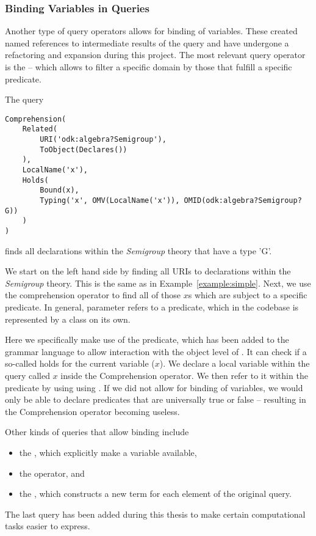 \subsubsection*{Binding Variables in Queries}\label{sec:qmt:binding}

Another type of query operators allows for binding of variables. 
These created named references to intermediate results of the query and have undergone a refactoring and expansion during this project. 
The most relevant query operator is the  -- which allows to filter a specific domain by those that fulfill a specific predicate.


\begin{example}\label{example:filter}
	The query \begin{lstlisting}[language=qmt]
Comprehension(
	Related(
		URI('odk:algebra?Semigroup'), 
		ToObject(Declares())
	), 
	LocalName('x'), 
	Holds(
		Bound(x), 
		Typing('x', OMV(LocalName('x')), OMID(odk:algebra?Semigroup?G))
	)
)
	\end{lstlisting}
	finds all declarations within the \textit{Semigroup} theory that have a type 'G'.
\end{example}

We start on the left hand side by finding all URIs to declarations within the \textit{Semigroup} theory. 
This is the same as in Example~\ref{example:simple}.
Next, we use the comprehension operator to find all of those $x$s which are subject to a specific predicate.
In general,  parameter refers to a predicate, which in the codebase is represented by a class on its own.

Here we specifically make use of the  predicate, which has been added to the grammar language to allow interaction with the object level of \mmt. 
It can check if a so-called  holds for the current variable ($x$).
We declare a local variable within the query called $x$ inside the Comprehension operator. 
We then refer to it within the predicate by using using .
If we did not allow for binding of variables, we would only be able to declare predicates that are universally true or false -- resulting in the Comprehension operator becoming useless. 

Other kinds of queries that allow binding include \begin{itemize}
	\item the , which explicitly make a variable available,  
	\item the  operator, and
  \item the , which constructs a new term for each element of the original query. 
\end{itemize}
The last  query has been added during this thesis to make certain computational tasks easier to express. 

